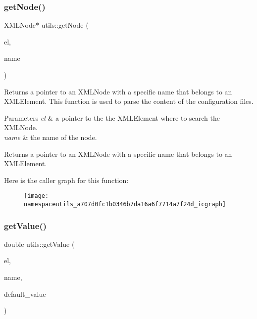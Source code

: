 \subsubsection{\texorpdfstring{get\+Node()}{getNode()}}
{\footnotesize\ttfamily X\+M\+L\+Node$\ast$ utils\+::get\+Node (\begin{DoxyParamCaption}\item[{X\+M\+L\+Element $\ast$}]{el,  }\item[{const char $\ast$}]{name }\end{DoxyParamCaption})}

Returns a pointer to an X\+M\+L\+Node with a specific name that belongs to an X\+M\+L\+Element. This function is used to parse the content of the configuration files. 
\begin{DoxyParams}{Parameters}
{\em el} & a pointer to the the X\+M\+L\+Element where to search the X\+M\+L\+Node. \\
\hline
{\em name} & the name of the node. \\
\hline
\end{DoxyParams}
\begin{DoxyReturn}{Returns}
a pointer to an X\+M\+L\+Node with a specific name that belongs to an X\+M\+L\+Element. 
\end{DoxyReturn}
Here is the caller graph for this function\+:\nopagebreak
\begin{figure}[H]
\begin{center}
\leavevmode
\texttt{[image: namespaceutils\_a707d0fc1b0346b7da16a6f7714a7f24d\_icgraph]}
\end{center}
\end{figure}
\mbox{\label{namespaceutils_a90cdccb9260004c67a61003d648b4e14}} 
\subsubsection{\texorpdfstring{get\+Value()}{getValue()}\hspace{0.1cm}{\footnotesize\ttfamily [1/5]}}
{\footnotesize\ttfamily double utils\+::get\+Value (\begin{DoxyParamCaption}\item[{X\+M\+L\+Element $\ast$}]{el,  }\item[{const char $\ast$}]{name,  }\item[{double}]{default\+\_\+value }\end{DoxyParamCaption})}

